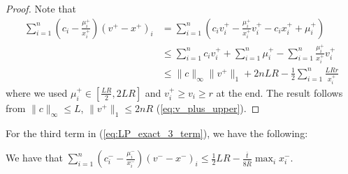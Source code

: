\begin{proof}
Note that
\begin{align*}
\sum^{n}_{i=1}(c_{i}-\frac{\mu^{+}_{i}}{x^{+}_{i}})(v^{+}-x^{+})_{i} & =\sum^{n}_{i=1}(c_{i}v^{+}_{i}-\frac{\mu^{+}_{i}}{x^{+}_{i}}v^{+}_{i}-c_{i}x^{+}_{i}+\mu^{+}_{i})\\
 & \leq\sum^{n}_{i=1}c_{i}v^{+}_{i}+\sum^{n}_{i=1}\mu^{+}_{i}-\sum^{n}_{i=1}\frac{\mu^{+}_{i}}{x^{+}_{i}}v^{+}_{i}\\
 & \leq\|c\|_{\infty}\|v^{+}\|_{1}+2nLR-\frac{1}{2}\sum^{n}_{i=1}\frac{LRr}{x^{+}_{i}}
\end{align*}
where we used $\mu^{+}_{i}\in[\frac{LR}{2},2LR]$ and $v^{+}_{i}\geq v_{i}\geq r$
at the end. The result follows from $\|c\|_{\infty}\leq L$, $\|v^{+}\|_{1}\leq2nR$
(\ref{eq:v_plus_upper}).
\end{proof}
For the third term in (\ref{eq:LP_exact_3_term}), we have the following:
\begin{lem}
\label{lem:LP_exact_3_term_2}We have that $\sum^{n}_{i=1}(c^{-}_{i}-\frac{\mu^{-}_{i}}{x^{-}_{i}})(v^{-}-x^{-})_{i}\leq\frac{1}{2}LR-\frac{\overline{t}}{8\overline{R}}\max_{i}x^{-}_{i}$.
\end{lem}

